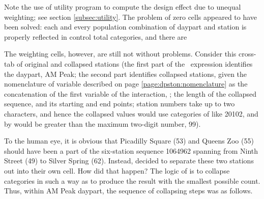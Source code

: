 \begin{stlog}
\nullskip
\end{stlog}

Note the use of utility program  to compute the design effect
due to unequal weighting; see section \ref{subsec:utility}. The problem of zero cells
appeared to have been solved: each and every population combination of daypart and station
is properly reflected in control total categories, and there are

The weighting cells, however, are still not without problems. Consider this
cross-tab of original and collapsed stations (the first part of the \ifexp\ expression identifies
the daypart, AM Peak; the second part identifies collapsed stations, given the nomenclature
of  variable described on page \ref{page:dpston:nomenclature} as the concatenation
of the first variable of the interaction, ; the length of the collapsed sequence,
and its starting and end points; station numbers take up to two characters, and hence the collapsed 
values would use categories of  like 20102, and  by 
would be greater than the maximum two-digit number, 99).

\begin{stlog}
\nullskip
\end{stlog}

To the human eye, it is obvious that Picadilly Square (53) and Queens Zoo (55) should have been
a part of the six-station sequence 1064962 spanning from Ninth Street (49) to Silver Spring (62).
Instead,  decided to separate these two stations out into their own cell.
How did that happen? The logic of  is to collapse categories in such a way
as to produce the result with the smallest possible count. Thus, within AM Peak daypart,
the sequence of collapsing steps was as follows.

